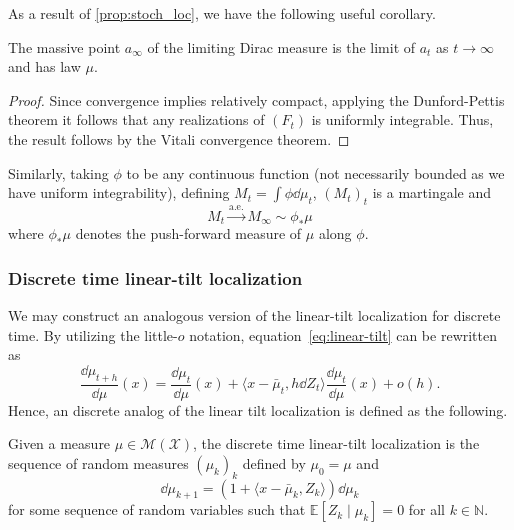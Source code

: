 As a result of \ref{prop:stoch_loc}, we have the following useful corollary.

\begin{corollary}\label{cor:lim_dis}
  The massive point \(a_\infty\) of the limiting Dirac measure is the limit of \(a_t\) as 
  \(t \to \infty\) and has law \(\mu\).
\end{corollary}
\begin{proof}
  Since convergence implies relatively compact, applying the Dunford-Pettis theorem it follows that 
  any realizations of \((F_t)\) is uniformly integrable. Thus, the result follows by the Vitali 
  convergence theorem.
\end{proof}

\begin{corollary}
  Similarly, taking \(\phi\) to be any continuous function (not necessarily bounded as we have uniform 
  integrability), defining \(M_t = \int \phi \dd\mu_t\), \((M_t)_t\) is a martingale and
  \begin{equation}\label{eq:lim_mart}
    M_t \xrightarrow{\text{a.e.}} M_\infty \sim \phi_* \mu
  \end{equation}
  where \(\phi_*\mu\) denotes the push-forward measure of \(\mu\) along \(\phi\).
\end{corollary}

\subsubsection{Discrete time linear-tilt localization}

We may construct an analogous version of the linear-tilt localization for discrete time. By utilizing 
the little-\(o\) notation, equation~\eqref{eq:linear-tilt} can be rewritten as 
\[\frac{\dd \mu_{t + h}}{\dd \mu}(x) = 
  \frac{\dd \mu_t}{\dd \mu}(x) + \langle x - \bar{\mu}_t, h\dd Z_t\rangle \frac{\dd \mu_t}{\dd \mu}(x) 
  + o(h).\]
Hence, an discrete analog of the linear tilt localization is defined as the following.

\begin{definition}
  Given a measure \(\mu \in \mathcal{M}(\mathcal{X})\), the discrete time linear-tilt localization 
  is the sequence of random measures \((\mu_k)_k\) defined by \(\mu_0 = \mu\) and 
  \begin{equation}\label{eq:discrete_tilt}
    \dd \mu_{k + 1} = (1 + \langle x - \bar{\mu}_k, Z_k \rangle)\dd \mu_k
  \end{equation} 
  for some sequence of random variables such that \(\mathbb{E}[Z_k \mid \mu_k] = 0\) for all 
  \(k \in \mathbb{N}\).
\end{definition}

